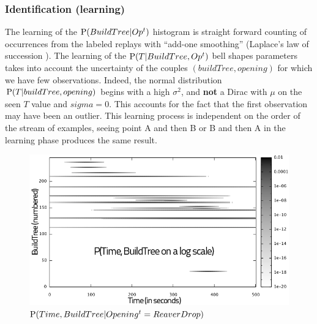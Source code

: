 \subsubsection{Identification (learning)}
The learning of the $\mathrm{P}(BuildTree | Op^t)$ histogram is straight forward counting of occurrences from the labeled replays with ``add-one smoothing'' (Laplace's law of succession \citep{Jaynes}). The learning of the $\mathrm{P}(T | BuildTree, Op^t)$ bell shapes parameters takes into account the uncertainty of the couples $(buildTree, opening)$ for which we have few observations. Indeed, the normal distribution $\mathrm{P}(T|buildTree, opening)$ begins with a high $\sigma^2$, and \textbf{not} a Dirac with $\mu$ on the seen $T$ value and $sigma=0$. This accounts for the fact that the first observation may have been an outlier. This learning process is independent on the order of the stream of examples, seeing point A and then B or B and then A in the learning phase produces the same result. 

\begin{figure}[htp]
\centerline{\includegraphics[width=0.7\columnwidth]{images/BW_HeatMap_knowing_ReaverDrop.png}}
\caption{$\mathrm{P}(Time, BuildTree | Opening^t=ReaverDrop)$}
\label{noise}
\end{figure}


